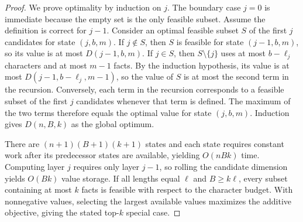\documentclass[letterpaper]{article} %
\begin{document}
\begin{proof}
We prove optimality by induction on $j$. The boundary case $j=0$ is immediate because the empty set is the only feasible subset. Assume the definition is correct for $j-1$. Consider an optimal feasible subset $S$ of the first $j$ candidates for state $(j,b,m)$. If $j\notin S$, then $S$ is feasible for state $(j-1,b,m)$, so its value is at most $D(j-1,b,m)$. If $j\in S$, then $S\setminus\{j\}$ uses at most $b-\ell_j$ characters and at most $m-1$ facts. By the induction hypothesis, its value is at most $D(j-1,b-\ell_j,m-1)$, so the value of $S$ is at most the second term in the recursion. Conversely, each term in the recursion corresponds to a feasible subset of the first $j$ candidates whenever that term is defined. The maximum of the two terms therefore equals the optimal value for state $(j,b,m)$. Induction gives $D(n,B,k)$ as the global optimum.

There are $(n+1)(B+1)(k+1)$ states and each state requires constant work after its predecessor states are available, yielding $O(nBk)$ time. Computing layer $j$ requires only layer $j-1$, so rolling the candidate dimension yields $O(Bk)$ value storage. If all lengths equal $\ell$ and $B\ge k\ell$, every subset containing at most $k$ facts is feasible with respect to the character budget. With nonnegative values, selecting the largest available values maximizes the additive objective, giving the stated top-$k$ special case.
\end{proof}
\end{document}
